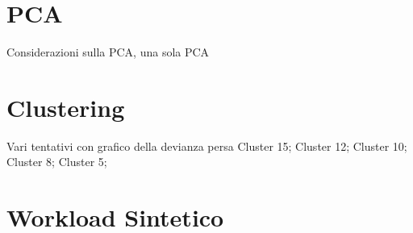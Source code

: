 \section{PCA}
Considerazioni sulla PCA, una sola PCA

\section{Clustering}
Vari tentativi con grafico della devianza persa
Cluster 15; Cluster 12; Cluster 10; Cluster 8; Cluster 5;

\section{Workload Sintetico}